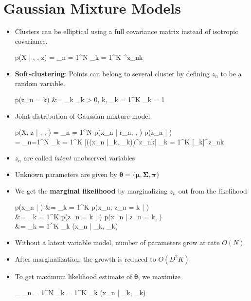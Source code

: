 

\section{Gaussian Mixture Models}
\begin{itemize}
	\item Clusters can be elliptical using a full covariance matrix instead of isotropic covariance.
	\begin{myalign*}
	    p(\*X | \bm \mu, \bm \Sigma, \*z) = \prod_{n = 1}^N \prod_{k = 1}^K 
		    ^{z_{nk}}
	\end{myalign*}

	\item \textbf{Soft-clustering}: Points can belong to several cluster by defining $z_n$ to be a random variable.
	\begin{myalign*}
		p(z_{n} = k) &= \pi_k  \pi_k > 0, \forall k, %
		\sum_{k = 1}^K \pi_k = 1
	\end{myalign*}
	\item Joint distribution of Gaussian mixture model
	\begin{myalign*}
	    p(\*X, \*z | \bm \mu, \bm \Sigma, \bm \pi)
	    = \prod_{n = 1}^N
	    	p(\*x_n | \*r_n, \bm \mu, \bm \Sigma) p(\*z_n | \bm \pi) \\
	    = \prod_{n=1}^N \prod_{k = 1}^K [(\N(\*x_n |\bm \mu_k, \bm \Sigma_k))^{z_{nk}}] \prod_{k = 1}^K [\pi_k]^{z_{nk}}
	\end{myalign*}
	\item $z_n$ are called \textit{latent} unobserved variables
	\item Unknown parameters are given by $ \bm \theta = \{\bm \mu, \bm \Sigma, \bm \pi\}$
	\item We get the \textbf{marginal likelihood} by marginalizing $z_n$ out from the likelihood
	\begin{myalign*}
	    p(\*x_n | \bm \theta) &= \sum_{k = 1}^K p(\*x_n, z_{n} = k | \bm \theta)\\
	    &= \sum_{k = 1}^K p(z_{n} = k | \bm \theta) p(\*x_n | z_{n} = k, \bm \theta)\\
	    &= \sum_{k = 1}^K \pi_k \N(\*x_n | \bm \mu_k, \bm \Sigma_k)
	\end{myalign*}
	\item Without a latent variable model, number of parameters grow at rate $O(N)$
	\item After marginalization, the growth is reduced to $O(D^2 K)$

	\item To get maximum likelihood estimate of $\bm \theta$, we maximize
	\begin{myalign*}
	    \max_{\bm \theta} \sum_{n = 1}^N \log \sum_{k = 1}^K \pi_k \N(\*x_n | \bm \mu_k, \bm \Sigma_k)
	\end{myalign*}
\end{itemize}

